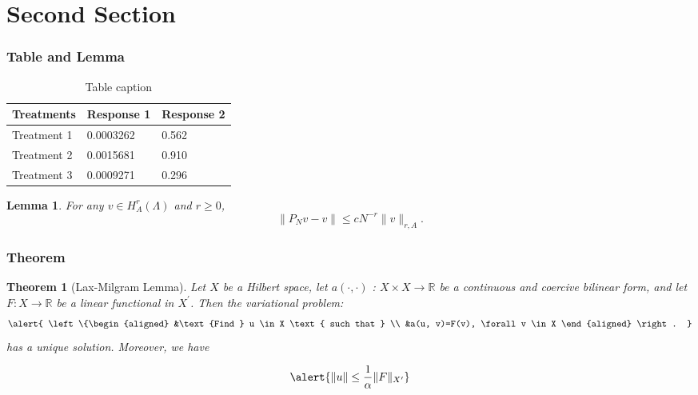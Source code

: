 \documentclass[compress]{beamer}
\numberwithin{figure}{section}
\numberwithin{table}{section}
\numberwithin{equation}{section}
\newtheorem{thm}{Theorem}
\numberwithin{thm}{section}
\numberwithin{defn}{section}
\newtheorem{lmm}{Lemma}
\numberwithin{lmm}{section}
\theoremstyle{example}
\numberwithin{figure}{section}
\numberwithin{table}{section}
\numberwithin{equation}{section}
\begin{document}
\section{Second Section}

\begin{frame}
\frametitle{Table and Lemma}
\begin{table}
\caption{Table caption}
\begin{tabular}{l l l}
\toprule
Treatments & Response 1 & Response 2 \\
\midrule
Treatment 1 & 0.0003262 & 0.562 \\
Treatment 2 & 0.0015681 & 0.910 \\
Treatment 3 & 0.0009271 & 0.296 \\
\bottomrule
\end{tabular}
\end{table}

\begin{lmm}
  For any $v \in H_{A}^{r}(\Lambda)$ and $r \geq 0$,
  \begin{equation}
    \|P_{N} v-v\| \leq c N^{-r}\|v\|_{r, A}.
  \end{equation}
\end{lmm}
\end{frame}


\begin{frame}
\frametitle{Theorem}

\begin{thm}[Lax-Milgram Lemma]
Let $X$ be a Hilbert space, let $a(\cdot, \cdot)$ : $X \times X \rightarrow \mathbb{R}$ be a continuous and coercive bilinear form, and let $F : X \rightarrow \mathbb{R}$ be a linear functional in $X^{\prime}$. Then the variational problem:
\begin{equation}
  \alert{
  \left\{\begin{aligned}
  &\text {Find } u \in X \text { such that } \\
  &a(u, v)=F(v), \forall v \in X
  \end{aligned} \right. }
\end{equation}
has a unique solution. Moreover, we have

\begin{equation}
  \alert{ \|u\| \leq \frac{1}{\alpha}\|F\|_{X^{\prime}}  }
\end{equation}
\end{thm}

\end{frame}
\end{document}
